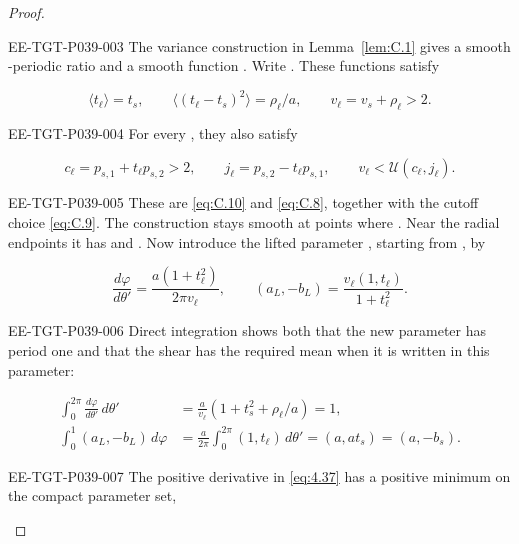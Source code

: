 \begin{proof}
\begin{EESegment}{EE-TGT-P039-003}
The variance construction in Lemma~\ref{lem:C.1} gives a smooth
-periodic ratio
 and a smooth function
. Write
. These functions satisfy
\end{EESegment}
\[
\langle t_\ell\rangle=t_s,
\qquad
\langle(t_\ell-t_s)^2\rangle=\rho_\ell/a,
\qquad
v_\ell=v_s+\rho_\ell>2.
\]
\begin{EESegment}{EE-TGT-P039-004}
For every , they also satisfy
\end{EESegment}
\[
c_\ell=p_{s,1}+t_\ell p_{s,2}>2,
\qquad
j_\ell=p_{s,2}-t_\ell p_{s,1},
\qquad
v_\ell<\mathcal U(c_\ell,j_\ell).
\]
\begin{EESegment}{EE-TGT-P039-005}
These are \eqref{eq:C.10} and \eqref{eq:C.8}, together with the cutoff choice
\eqref{eq:C.9}. The construction stays smooth at points where
. Near the radial endpoints it has
 and .
Now introduce the lifted parameter , starting from
, by
\end{EESegment}
\begin{equation}
\frac{d\varphi}{d\theta'}=\frac{a(1+t_\ell^2)}{2\pi v_\ell},
\qquad
(a_L,-b_L)=\frac{v_\ell(1,t_\ell)}{1+t_\ell^2}.
\tag{4.37}\label{eq:4.37}
\end{equation}
\begin{EESegment}{EE-TGT-P039-006}
Direct integration shows both that the new parameter has period one and that the shear has the
required mean when it is written in this parameter:
\end{EESegment}
\begin{align*}
\int_0^{2\pi}\frac{d\varphi}{d\theta'}\,d\theta'
   &=\frac a{v_\ell}(1+t_s^2+\rho_\ell/a)=1,\\
\int_0^1(a_L,-b_L)\,d\varphi
   &=\frac a{2\pi}\int_0^{2\pi}(1,t_\ell)\,d\theta'
     =(a,at_s)=(a,-b_s).
\end{align*}
\begin{EESegment}{EE-TGT-P039-007}
The positive derivative in \eqref{eq:4.37} has a positive minimum on the compact parameter set,

\end{EESegment}
\end{proof}
